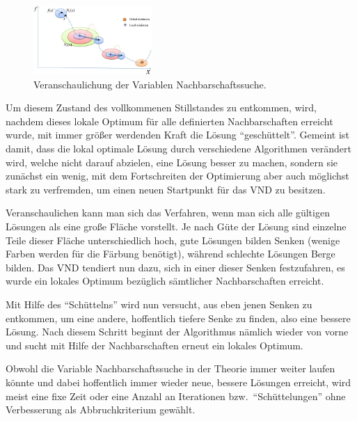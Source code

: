 \begin{figure}
\vspace{-8mm}
\begin{center}
\includegraphics[width=0.4\textwidth]{../img/vns.jpg}
\end{center}
\vspace{-8mm}
\caption{Veranschaulichung der Variablen Nachbarschaftssuche. \cite{Chen}}
\vspace{-8mm}
\end{figure}

Um diesem Zustand des vollkommenen Stillstandes zu entkommen, wird, nachdem dieses lokale Optimum für alle definierten Nachbarschaften erreicht wurde, mit immer größer werdenden Kraft die Lösung ``geschüttelt''. Gemeint ist damit, dass die lokal optimale Lösung durch verschiedene Algorithmen verändert wird, welche nicht darauf abzielen, eine Lösung besser zu machen, sondern sie zunächst ein wenig, mit dem Fortschreiten der Optimierung aber auch möglichst stark zu verfremden, um einen neuen Startpunkt für das VND zu besitzen.

Veranschaulichen kann man sich das Verfahren, wenn man sich alle gültigen Lösungen als eine große Fläche vorstellt. Je nach Güte der Lösung sind einzelne Teile dieser Fläche unterschiedlich hoch, gute Lösungen bilden Senken (wenige Farben werden für die Färbung benötigt), während schlechte Lösungen Berge bilden. Das VND tendiert nun dazu, sich in einer dieser Senken festzufahren, es wurde ein lokales Optimum bezüglich sämtlicher Nachbarschaften erreicht.

Mit Hilfe des ``Schüttelns'' wird nun versucht, aus eben jenen Senken zu entkommen, um eine andere, hoffentlich tiefere Senke zu finden, also eine bessere Lösung. Nach diesem Schritt beginnt der Algorithmus nämlich wieder von vorne und sucht mit Hilfe der Nachbarschaften erneut ein lokales Optimum.

Obwohl die Variable Nachbarschaftssuche in der Theorie immer weiter laufen könnte und dabei hoffentlich immer wieder neue, bessere Lösungen erreicht, wird meist eine fixe Zeit oder eine Anzahl an Iterationen bzw.\ ``Schüttelungen'' ohne Verbesserung als Abbruchkriterium gewählt.

